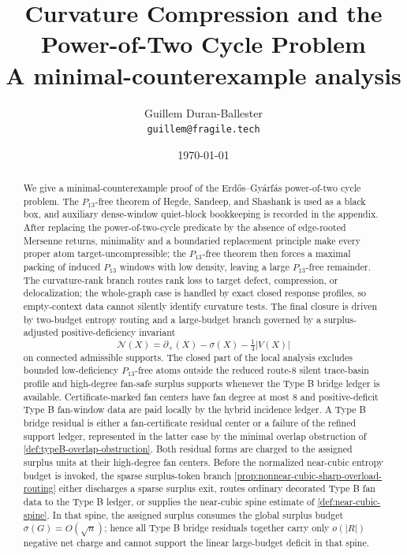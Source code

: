 \documentclass[11pt]{article}
\title{Curvature Compression and the Power-of-Two Cycle Problem\\
\large A minimal-counterexample analysis}
\author{Guillem Duran-Ballester\\\texttt{guillem@fragile.tech}}
\date{\today}
\begin{document}
\maketitle

\begin{abstract}
We give a minimal-counterexample proof of the Erd\H{o}s--Gy\'arf\'as
power-of-two cycle problem.  The $P_{13}$-free theorem of Hegde, Sandeep,
and Shashank is used as a black box, and auxiliary dense-window quiet-block
bookkeeping is recorded in the appendix.  After replacing the power-of-two-cycle predicate by the
absence of edge-rooted Mersenne returns, minimality and a boundaried
replacement principle make every proper atom target-uncompressible; the
$P_{13}$-free theorem then forces a maximal packing of induced $P_{13}$
windows with low density, leaving a large $P_{13}$-free remainder.  The
curvature-rank branch routes rank loss to target defect, compression, or
delocalization; the whole-graph case is handled by exact closed response
profiles, so empty-context data cannot silently identify curvature tests.  The
final closure is driven by two-budget entropy routing and a large-budget branch governed by a surplus-adjusted
positive-deficiency invariant
\[
\mathcal N(X)=\partial_+(X)-\sigma(X)-\tfrac14|V(X)|
\]
on connected admissible supports.  The closed part of the local analysis
excludes bounded low-deficiency $P_{13}$-free atoms outside the reduced route-8
silent trace-basin profile and high-degree fan-safe surplus supports whenever
the Type B bridge ledger is available.  Certificate-marked fan centers have fan
degree at most $8$ and positive-deficit Type B fan-window data are paid locally
by the hybrid incidence ledger.  A Type B bridge residual is either a
fan-certificate residual center or a failure of the refined support ledger,
represented in the latter case by the minimal overlap obstruction of
\cref{def:typeB-overlap-obstruction}.  Both residual forms are charged to the
assigned surplus units at their high-degree fan centers.  Before the normalized
near-cubic entropy budget is invoked, the sparse surplus-token branch
\cref{prop:nonnear-cubic-sharp-overload-routing} either discharges a sparse
surplus exit, routes ordinary decorated Type B fan data to the Type B ledger, or
supplies the near-cubic spine estimate of \cref{def:near-cubic-spine}.  In that
spine, the assigned surplus consumes the global
surplus budget $\sigma(G)=O(\sqrt n)$; hence all Type B bridge residuals
together carry only $o(|R|)$ negative net charge and cannot support the linear
large-budget deficit in that spine.

\end{abstract}
\end{document}
